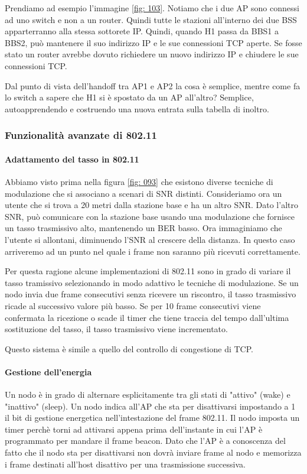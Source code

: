 \documentclass[11pt,a4paper]{article}
\begin{document}
{Prendiamo ad esempio l'immagine \ref{fig: 103}. Notiamo che i due AP sono connessi ad uno switch e non a un router. Quindi tutte le stazioni all'interno dei due BSS apparterranno alla stessa sottorete IP. Quindi, quando H1 passa da BBS1 a BBS2, può mantenere il suo indirizzo IP e le sue connessioni TCP aperte. Se fosse stato un router avrebbe dovuto richiedere un nuovo indirizzo IP e chiudere le sue connessioni TCP.

Dal punto di vista dell'handoff tra AP1 e AP2 la cosa è semplice, mentre come fa lo switch a sapere che H1 si è spostato da un AP all'altro? Semplice, autoapprendendo e costruendo una nuova entrata sulla tabella di inoltro.

\subsubsection{Funzionalità avanzate di 802.11}
\paragraph{Adattamento del tasso in 802.11}
Abbiamo visto prima nella figura  \ref{fig: 093} che esistono diverse tecniche di modulazione che si associano a scenari di SNR distinti. Consideriamo ora un utente che si trova a 20 metri dalla stazione base e ha un altro SNR. Dato l'altro SNR, può comunicare con la stazione base usando una modulazione che fornisce un tasso trasmissivo alto, mantenendo un BER basso. Ora immaginiamo che l'utente si allontani, diminuendo l'SNR al crescere della distanza. In questo caso arriveremo ad un punto nel quale i frame non saranno più ricevuti correttamente.

Per questa ragione alcune implementazioni di 802.11 sono in grado di variare il tasso tramissivo selezionando in modo adattivo le tecniche di modulazione. Se un nodo invia due frame consecutivi senza ricevere un riscontro, il tasso trasmissivo ricade al successivo valore più basso. Se per 10 frame consecutivi viene confermata la ricezione o scade il timer che tiene traccia del tempo dall'ultima sostituzione del tasso, il tasso trasmissivo viene incrementato.

Questo sistema è simile a quello del controllo di congestione di TCP.

\paragraph{Gestione dell'energia}
Un nodo è in grado di alternare esplicitamente tra gli stati di "attivo" (wake) e "inattivo" (sleep). Un nodo indica all'AP che sta per disattivarsi impostando a 1 il bit di gestione energetica nell'intestazione del frame 802.11. Il nodo imposta un timer perchè torni ad attivarsi appena prima dell'instante in cui l'AP è programmato per mandare il frame beacon. Dato che l'AP è a conoscenza del fatto che il nodo sta per disattivarsi non dovrà inviare frame al nodo e memorizza i frame destinati all'host disattivo per una trasmissione successiva.
\pagebreak

}
\end{document}
